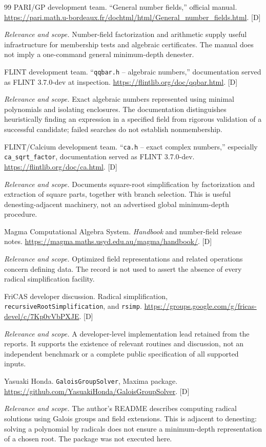 \documentclass[11pt,oneside]{article}
\numberwithin{equation}{section}
\theoremstyle{definition}
\theoremstyle{remark}
\newcommand{\status}[1]{\textsf{\small[#1]}}
\newcommand{\entrynote}[1]{\par\smallskip\noindent\emph{Relevance and scope.} #1}
\begin{document}
\begin{thebibliography}{99}
PARI/GP development team. ``General number fields,'' official manual. \url{https://pari.math.u-bordeaux.fr/dochtml/html/General_number_fields.html}. \status{D}
\entrynote{Number-field factorization and arithmetic supply useful infrastructure for membership tests and algebraic certificates. The manual does not imply a one-command general minimum-depth denester.}

FLINT development team. ``\texttt{qqbar.h} -- algebraic numbers,'' documentation served as FLINT 3.7.0-dev at inspection. \url{https://flintlib.org/doc/qqbar.html}. \status{D}
\entrynote{Exact algebraic numbers represented using minimal polynomials and isolating enclosures. The documentation distinguishes heuristically finding an expression in a specified field from rigorous validation of a successful candidate; failed searches do not establish nonmembership.}

FLINT/Calcium development team. ``\texttt{ca.h} -- exact complex numbers,'' especially \texttt{ca\_sqrt\_factor}, documentation served as FLINT 3.7.0-dev. \url{https://flintlib.org/doc/ca.html}. \status{D}
\entrynote{Documents square-root simplification by factorization and extraction of square parts, together with branch selection. This is useful denesting-adjacent machinery, not an advertised global minimum-depth procedure.}

Magma Computational Algebra System. \emph{Handbook} and number-field release notes. \url{https://magma.maths.usyd.edu.au/magma/handbook/}. \status{D}
\entrynote{Optimized field representations and related operations concern defining data. The record is not used to assert the absence of every radical simplification facility.}

FriCAS developer discussion. Radical simplification, \texttt{recursiveRootSimplification}, and \texttt{rsimp}. \url{https://groups.google.com/g/fricas-devel/c/7Kp0vVbPXJE}. \status{D}
\entrynote{A developer-level implementation lead retained from the reports. It supports the existence of relevant routines and discussion, not an independent benchmark or a complete public specification of all supported inputs.}

Yasuaki Honda. \texttt{GaloisGroupSolver}, Maxima package. \url{https://github.com/YasuakiHonda/GaloisGroupSolver}. \status{D}
\entrynote{The author's README describes computing radical solutions using Galois groups and field extensions. This is adjacent to denesting: solving a polynomial by radicals does not ensure a minimum-depth representation of a chosen root. The package was not executed here.}


\end{thebibliography}
\end{document}

